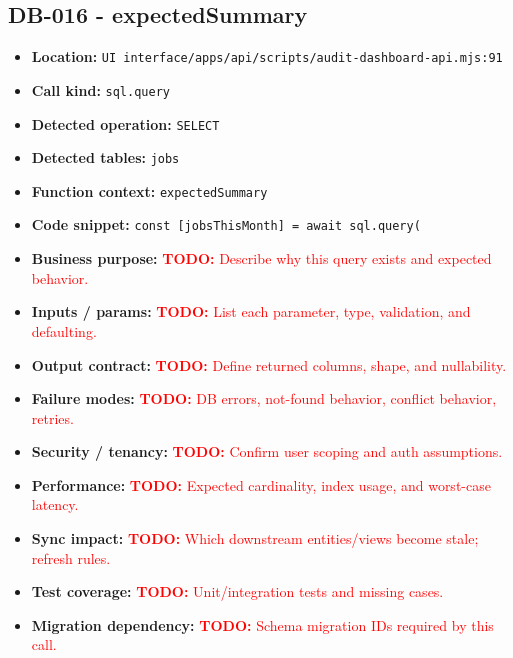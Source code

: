 \documentclass[11pt]{article}
\newcommand{\todoitem}[1]{\textcolor{red}{\textbf{TODO:} #1}}
\begin{document}
\subsection{DB-016 - expectedSummary}
\begin{itemize}[leftmargin=1.5em]
\item \textbf{Location:} \texttt{UI interface/apps/api/scripts/audit-dashboard-api.mjs:91}
\item \textbf{Call kind:} \texttt{sql.query}
\item \textbf{Detected operation:} \texttt{SELECT}
\item \textbf{Detected tables:} \texttt{jobs}
\item \textbf{Function context:} \texttt{expectedSummary}
\item \textbf{Code snippet:} \texttt{const [jobsThisMonth] = await sql.query(}
\item \textbf{Business purpose:} \todoitem{Describe why this query exists and expected behavior.}
\item \textbf{Inputs / params:} \todoitem{List each parameter, type, validation, and defaulting.}
\item \textbf{Output contract:} \todoitem{Define returned columns, shape, and nullability.}
\item \textbf{Failure modes:} \todoitem{DB errors, not-found behavior, conflict behavior, retries.}
\item \textbf{Security / tenancy:} \todoitem{Confirm user scoping and auth assumptions.}
\item \textbf{Performance:} \todoitem{Expected cardinality, index usage, and worst-case latency.}
\item \textbf{Sync impact:} \todoitem{Which downstream entities/views become stale; refresh rules.}
\item \textbf{Test coverage:} \todoitem{Unit/integration tests and missing cases.}
\item \textbf{Migration dependency:} \todoitem{Schema migration IDs required by this call.}
\end{itemize}
\end{document}
